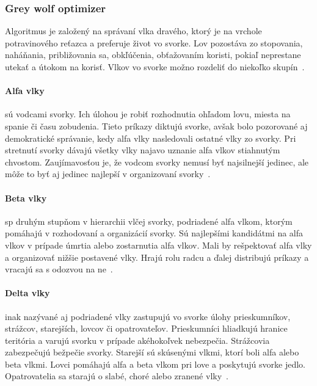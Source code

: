 \documentclass[a4paper,slovak,12pt,appendix]{article}
\begin{document}

\subsubsection{Grey wolf optimizer}
Algoritmus je založený na správaní vlka dravého, ktorý je na vrchole
potravinového reťazca a preferuje život vo svorke. Lov pozostáva zo stopovania,
naháňania, približovania sa, obkľúčenia, obťažovaním koristi, pokiaľ neprestane
utekať a útokom na korisť. Vlkov vo svorke možno
rozdeliť do niekoľko skupín~\cite{Seeley1991}.

\paragraph{Alfa vlky} sú vodcami svorky. Ich úlohou je robiť rozhodnutia
ohľadom lovu, miesta na spanie či času zobudenia. Tieto príkazy diktujú svorke,
avšak bolo pozorované aj demokratické správanie, kedy alfa vlky nasledovali
ostatné vlky zo svorky. Pri stretnutí svorky dávajú všetky vlky najavo uznanie
alfa vlkov stiahnutým chvostom. Zaujímavosťou je, že vodcom svorky nemusí byť
najsilnejší jedinec, ale môže to byť aj jedinec najlepší v organizovaní
svorky~\cite{Seeley1991}.

\paragraph{Beta vlky} sp druhým stupňom v hierarchii vlčej svorky, podriadené
alfa vlkom, ktorým pomáhajú v rozhodovaní a organizácií svorky. Sú najlepšími
kandidátmi na alfa vlkov v prípade úmrtia alebo zostarnutia alfa vlkov. Mali by
rešpektovať alfa vlky a organizovať nižšie postavené vlky. Hrajú rolu radcu
a ďalej distribujú príkazy a vracajú sa s odozvou na ne~\cite{Seeley1991}.

\paragraph{Delta vlky} inak nazývané aj podriadené vlky zastupujú vo svorke
úlohy prieskumníkov, strážcov, starejších, lovcov či opatrovateľov.
Prieskumníci hliadkujú hranice teritória a varujú svorku v prípade akéhokoľvek
nebezpečia. Strážcovia zabezpečujú bežpečie svorky. Starejší sú skúsenými
vlkmi, ktorí boli alfa alebo beta vlkmi. Lovci pomáhajú alfa a beta vlkom pri
love a poskytujú svorke jedlo. Opatrovatelia sa starajú o slabé, choré alebo
zranené vlky~\cite{Seeley1991}.
\end{document}
